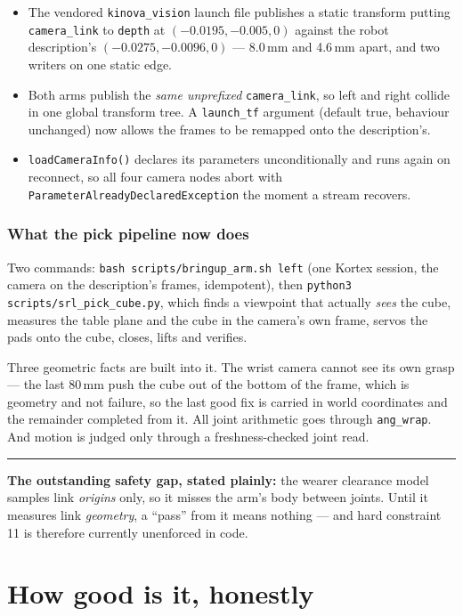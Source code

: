 \documentclass[11pt,a4paper,oneside]{report}
\newcommand{\code}[1]{\texttt{\small #1}}
\newcommand{\keyfact}[1]{%
  \par\vspace{7pt}\noindent
  \hspace*{0pt}\textcolor{srlblue}{\rule{2.5pt}{\dimexpr\baselineskip\relax}}%
  \hspace{9pt}%
  \begin{minipage}[t]{\dimexpr\textwidth-14pt\relax}
  \small #1
  \end{minipage}\par\vspace{7pt}}
\begin{document}
\begin{itemize}
\item The vendored \code{kinova\_vision} launch file publishes a static
      transform putting \code{camera\_link} to \code{depth} at
      $(-0.0195, -0.005, 0)$ against the robot description's
      $(-0.0275, -0.0096, 0)$ --- 8.0\,mm and 4.6\,mm apart, and two writers on
      one static edge.
\item Both arms publish the \emph{same unprefixed} \code{camera\_link}, so left
      and right collide in one global transform tree. A \code{launch\_tf}
      argument (default true, behaviour unchanged) now allows the frames to be
      remapped onto the description's.
\item \code{loadCameraInfo()} declares its parameters unconditionally and runs
      again on reconnect, so all four camera nodes abort with
      \code{ParameterAlreadyDeclaredException} the moment a stream recovers.
\end{itemize}

\subsection{What the pick pipeline now does}

Two commands: \code{bash scripts/bringup\_arm.sh left} (one Kortex session, the
camera on the description's frames, idempotent), then
\code{python3 scripts/srl\_pick\_cube.py}, which finds a viewpoint that actually
\emph{sees} the cube, measures the table plane and the cube in the camera's own
frame, servos the pads onto the cube, closes, lifts and verifies.

Three geometric facts are built into it. The wrist camera cannot see its own
grasp --- the last 80\,mm push the cube out of the bottom of the frame, which is
geometry and not failure, so the last good fix is carried in world coordinates
and the remainder completed from it. All joint arithmetic goes through
\code{ang\_wrap}. And motion is judged only through a freshness-checked joint
read.

\keyfact{\textbf{The outstanding safety gap, stated plainly:} the wearer
clearance model samples link \emph{origins} only, so it misses the arm's body
between joints. Until it measures link \emph{geometry}, a ``pass'' from it means
nothing --- and hard constraint 11 is therefore currently unenforced in code.}

\chapter{How good is it, honestly}
\end{document}
